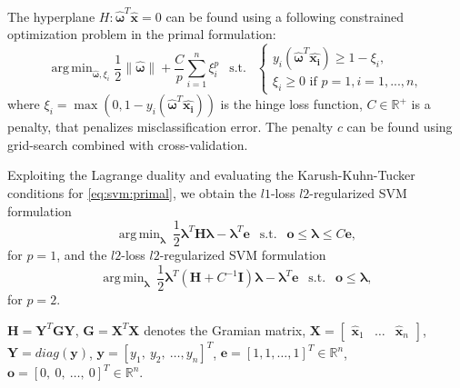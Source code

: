 \documentclass{aip-cp}
\DeclareMathOperator*{\argmin}{arg\,min}
\begin{document}
The hyperplane \(H: \boldsymbol{\widehat{\omega}}^T\boldsymbol{\widehat{x}}=0\) can be found using a following constrained optimization problem in the primal formulation:
\begin{equation}
    \argmin_{\boldsymbol{\widehat{\omega}},\xi_i} \frac{1}{2}\|\boldsymbol{\widehat{\omega}}\| + \frac{C}{p}\sum_{i = 1}^n\xi_i^p ~~\text{ s.t. } ~~
    \begin{cases}
        y_i(\boldsymbol{\widehat{\omega}}^T\boldsymbol{\widehat{x_i}})\geq1 - \xi_i,\\
        \xi_i \geq 0 \text{ if } p=1, i=1, ...,n,
    \end{cases}
    \label{eq:svm:primal}
\end{equation}
where \(\xi_i = \max(0, 1-y_i(\boldsymbol{\widehat{\omega}}^T\boldsymbol{\widehat{x_i}}))\) is the hinge loss function, \(C \in \mathbb{R}^+\) is a penalty, that penalizes misclassification error. The penalty $c$ can be found using grid-search combined with cross-validation.

Exploiting the Lagrange duality and evaluating the Karush-Kuhn-Tucker conditions for \eqref{eq:svm:primal},
we obtain the $l1$-loss $l2$-regularized SVM formulation
\begin{equation}
    \argmin_{\boldsymbol{\lambda}} \ \frac{1}{2} \boldsymbol{\lambda}^T \boldsymbol{H}  \boldsymbol{\lambda} -  \boldsymbol{\lambda}^T \boldsymbol{e} ~~\text{ s.t. }~~ \boldsymbol{o} \leq  \boldsymbol{\lambda} \leq C\boldsymbol{e},
    \label{eq:svm:dualL1}
\end{equation}
for $p=1$, and the $l2$-loss $l2$-regularized SVM formulation
\begin{equation}
    \argmin_{\boldsymbol{\lambda}} \ \frac{1}{2} \boldsymbol{\lambda}^T \left(\boldsymbol{H} + C^{-1} \boldsymbol{I} \right) \boldsymbol{\lambda} -  \boldsymbol{\lambda}^T \boldsymbol{e} ~~\text{ s.t. }~~    \boldsymbol{o} \leq  \boldsymbol{\lambda},
    \label{eq:svm:dualL2}
\end{equation}
for $p=2$.

$\boldsymbol{H} = \boldsymbol{Y}^T \boldsymbol{G} \boldsymbol{Y}$, $\boldsymbol{G} = \boldsymbol{X}^T\boldsymbol{X}$ denotes the Gramian matrix, $\boldsymbol{X}= \begin{bmatrix} \boldsymbol{\widehat{x}}_1 & \dots & \boldsymbol{\widehat{x}}_n \end{bmatrix}$, $\boldsymbol{Y} = diag(\boldsymbol{y})$, $\boldsymbol{y} = \left[y_1, \ y_2, \  \dots, y_n\right]^T$, $\boldsymbol{e} = \left[1, 1, \dots, 1\right]^T \in \mathbb{R}^n$, $\boldsymbol{o} = \left[0, \ 0,  \ \dots, \ 0\right]^T \in \mathbb{R}^n$.
\end{document}
